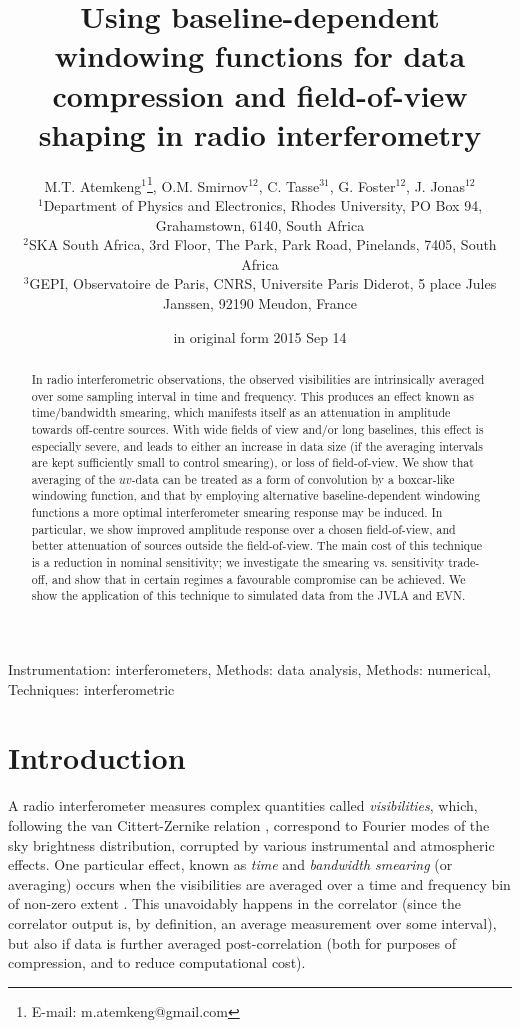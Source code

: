 \documentclass[useAMS,usenatbib]{mn2e}
\title[BDWFs for data compression and FoV shaping]{Using baseline-dependent windowing functions 
for data compression and field-of-view shaping in radio interferometry}
\author[M.T. Atemkeng, O.M. Smirnov, C. Tasse, G. Foster and J. Jonas]{M.T. 
Atemkeng$^{1}$\thanks{E-mail: m.atemkeng@gmail.com}, O.M. Smirnov$^{12}$, C. Tasse$^{31}$, G. Foster$^{12}$, J. Jonas$^{12}$ \\
$^1$Department of Physics and Electronics, Rhodes University, PO Box 94, Grahamstown, 6140, South Africa\\
$^2$SKA South Africa, 3rd Floor, The Park, Park Road, Pinelands, 7405, South Africa\\
$^3$GEPI, Observatoire de Paris, CNRS, Universite Paris Diderot, 5 place Jules Janssen, 92190 Meudon, France}
\begin{document}
\date{in original form 2015 Sep 14}

\pagerange{\pageref{firstpage}--\pageref{lastpage}} 

\maketitle

\label{firstpage}

\begin{abstract}


In radio interferometric observations, the observed visibilities are intrinsically averaged over some sampling interval
in time and frequency. This produces an effect known as time/bandwidth smearing, which manifests itself as an attenuation 
in amplitude towards off-centre sources. With wide fields of view and/or long baselines, this effect is especially severe,
and leads to either an increase in data size (if the averaging intervals are kept sufficiently small to control smearing), or 
loss of field-of-view. We show that averaging of the $uv$-data can be treated as a form of convolution by a boxcar-like 
windowing function, and that by employing alternative baseline-dependent windowing functions a more optimal interferometer 
smearing response may be induced. In particular, we show improved amplitude response over a chosen field-of-view, and 
better attenuation of sources outside the field-of-view. The main cost of this technique is a reduction in nominal 
sensitivity; we investigate the smearing vs. sensitivity trade-off, and show that in certain regimes a favourable 
compromise can be achieved. We show the application of this technique to simulated data from the JVLA and EVN.

\end{abstract}
\begin{keywords}
Instrumentation: interferometers, Methods: data analysis, Methods: numerical, Techniques: interferometric
\end{keywords}

\section[]{Introduction}

A radio interferometer measures complex quantities called \emph{visibilities}, which, following the van Cittert-Zernike 
relation \citep{thompson1999fundamentals,thompson2001fundamentals}, correspond to Fourier modes of the sky brightness distribution, corrupted by various instrumental 
and atmospheric effects. One particular effect, known as \emph{time} and \emph{bandwidth smearing} (or averaging) occurs 
when the visibilities are averaged over a time and frequency bin of non-zero extent \citep{bridle1989wide,bridle1999bandwidth}. This unavoidably happens in the correlator 
(since the correlator output is, by definition, an average measurement over some interval), but also if data is further 
averaged post-correlation (both for purposes of compression, and to reduce computational cost).
\end{document}

